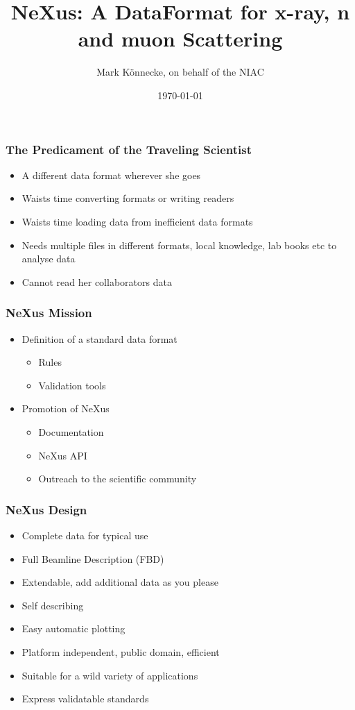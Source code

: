 \documentclass{beamer}
\title{NeXus: A DataFormat for x-ray, n and muon Scattering}
\author{Mark K\"onnecke, on behalf of the NIAC }
\institute{Paul Scherrer Institute\\Switzerland }
\date{\today}
\begin{document}
\begin{frame}
\titlepage
\end{frame}

\begin{frame}
\frametitle{The Predicament of the Traveling Scientist}
\begin{itemize}
\item<1->A different data format wherever she goes
\item<2->Waists time converting formats or writing readers
\item<3->Waists time loading data from inefficient data formats
\item<4->Needs multiple files in different formats, local knowledge, 
  lab books etc to analyse data
\item<5->Cannot read her collaborators data
\end{itemize}
\end{frame}

\begin{frame} \frametitle{NeXus Mission}
\begin{itemize}
\item Definition of a standard data format
\begin{itemize}
\item Rules
\item Validation tools
\end{itemize}
\item Promotion of NeXus
\begin{itemize}
\item Documentation
\item NeXus API
\item Outreach to the scientific community
\end{itemize}
\end{itemize}
\end{frame}


\begin{frame} \frametitle{NeXus Design}
\begin{itemize}
\item Complete data for typical use
\item Full Beamline Description (FBD)
\item Extendable, add additional data as you please
\item Self describing
\item Easy automatic plotting
\item Platform independent, public domain, efficient
\item Suitable for a wild variety of applications
\item Express validatable standards
\end{itemize}
\end{frame}
\end{document}
